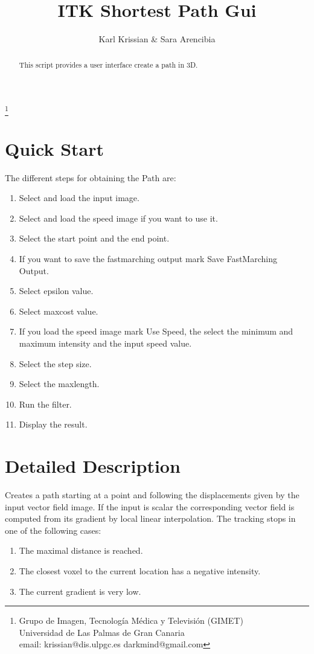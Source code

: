 \documentclass{article}
\begin{document}
\title{ITK Shortest Path Gui}
\author{Karl Krissian \& Sara Arencibia}
\thanks{
Grupo de Imagen, Tecnolog\'ia M\'edica y Televisi\'on (GIMET)\\
Universidad de Las Palmas de Gran Canaria\\
email: krissian@dis.ulpgc.es darkmind@gmail.com
}


\maketitle

\begin{abstract}
This script provides a user interface create a path in 3D.
\end{abstract}


\section{Quick Start}

The different steps for obtaining the Path are:
\begin{enumerate}
  \item Select and load the input image.
  \item Select and load the speed image if you want to use it.
  \item Select the start point and the end point.
  \item If you want to save the fastmarching output mark Save FastMarching Output.
  \item Select epsilon value.
  \item Select maxcost value.
  \item If you load the speed image mark Use Speed, the select the minimum and maximum intensity and the input speed value.
  \item Select the step size.
  \item Select the maxlength.
  \item Run the filter.
  \item Display the result.
\end{enumerate}


\section{Detailed Description}
Creates a path starting at a point and following the displacements given by the input vector field image. 
If the input is scalar the corresponding vector field is computed from its gradient by local linear interpolation.
The tracking stops in one of the following cases:
\begin{enumerate}
  \item The maximal distance is reached.
  \item The closest voxel to the current location has a negative intensity.
  \item The current gradient is very low.
\end{enumerate}
\end{document}
